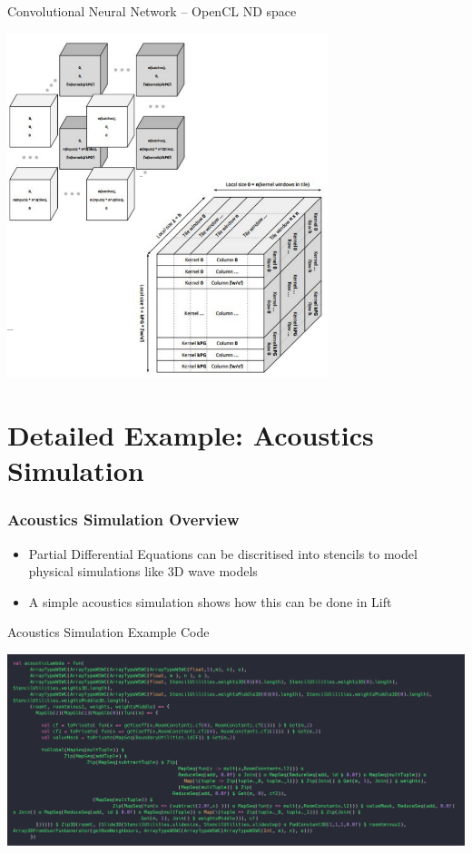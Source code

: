 \documentclass[10pt]{beamer}
\begin{document}
\begin{frame}{Convolutional Neural Network -- OpenCL ND space}
\vspace{-1.5cm}
    \begin{block}{}
        \begin{center}
            \includegraphics[width=0.7\textwidth]{../images/conv_nd.pdf}
        \end{center}
    \end{block}
\vspace{-1.2cm}
\end{frame}

\section{Detailed Example: Acoustics Simulation }

\begin{frame}
\frametitle{Acoustics Simulation Overview}
\vspace{.2cm}
\begin{itemize}
    \item Partial Differential Equations can be discritised into stencils to model physical simulations like 3D wave models 
    \item A simple acoustics simulation shows how this can be done in Lift 
\end{itemize}
\vspace{-1.2cm}
\end{frame}

\begin{frame}{Acoustics Simulation Example Code}
        \begin{block}{}
        \begin{center}
            \includegraphics[width=\textwidth]{../images/acousticLambda.png}
        \end{center}
        \end{block}
\end{frame}

\appendix
\end{document}
